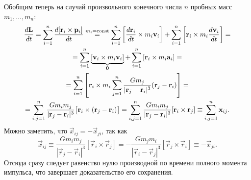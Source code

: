 Обобщим теперь на случай произвольного конечного числа $n$ пробных масс $m_1, \ldots, m_n$:
\begin{multline*}
	\frac{d\mathbf{L}}{dt} =  \sum\limits_{i=1}^n \frac{d[\mathbf{r}_i \times \mathbf{p}_i]}{dt} \overset{m_i=\operatorname{const}}{=} \sum\limits_{i=1}^n \left[\frac{d\mathbf{r}_i}{dt} \times m_i\mathbf{v}_i \right] + \sum\limits_{i=1}^n \left[\mathbf{r}_i \times m_i \frac{d\mathbf{v}_i}{dt} \right] = \\
	= \sum\limits_{i=1}^n \underbrace{\left[\mathbf{v}_i \times m_i\mathbf{v}_i \right]}_{\mathbf{0}} + \sum\limits_{i=1}^n \left[\mathbf{r}_i \times m_i \mathbf{a}_i \right] = \\
	= \sum\limits_{i=1}^n \left[ \mathbf{r}_i \times m_i \sum\limits_{j=1}^n \frac{G m_j}{|\mathbf{r}_j - \mathbf{r}_i|^3} (\mathbf{r}_j - \mathbf{r}_i) \right] = \\
	= \sum\limits_{i,j=1}^n \frac{G m_i m_j}{|\mathbf{r}_j - \mathbf{r}_i|^3} \big[\mathbf{r}_i \times (\mathbf{r}_j - \mathbf{r}_i) \big] = \sum\limits_{i,j=1}^n \frac{G m_i m_j}{|\mathbf{r}_j - \mathbf{r}_i|^3} [\mathbf{r}_i \times \mathbf{r}_j] \equiv \sum\limits_{i,j=1}^n \mathbf{x}_{ij}.
\end{multline*}
Можно заметить, что $\vec{x}_{ij} = -\vec{x}_{ji}$, так как
\begin{equation*}
	\vec{x}_{ij} \equiv \frac{G m_i m_j}{|\vec{r}_j - \vec{r}_i|^3} [\vec{r}_i \times \vec{r}_j] = - \frac{G m_j m_i}{|\vec{r}_i - \vec{r}_j|^3} [\vec{r}_j \times \vec{r}_i] \equiv -\vec{x}_{ji}.
\end{equation*}
Отсюда сразу следует равенство нулю производной по времени полного момента импульса, что завершает доказательство его сохранения.

